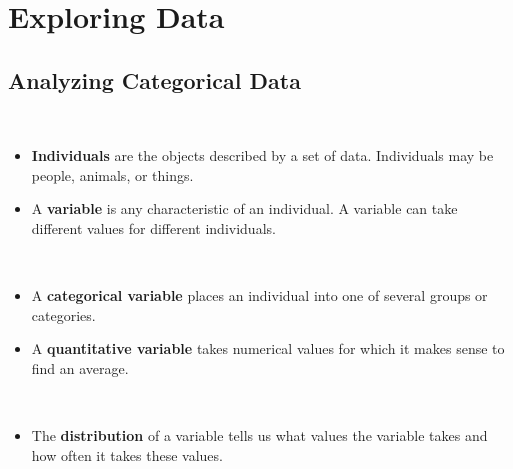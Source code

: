\documentclass[Main.tex]{subfiles}
\begin{document}
	
	\chapter{Exploring Data}
	
	
	\section{Analyzing Categorical Data}
	
	\begin{exercise} \hfill \\
		\begin{itemize}
			\item \textbf{Individuals} are the objects described by a set of data. Individuals may be people, animals, or things.\\
			\item A \textbf{variable} is any characteristic of an individual. A variable can take different values for different individuals.\\
		\end{itemize}
	\end{exercise}
			
	\begin{exercise} \hfill \\
		\begin{itemize}		
			\item A \textbf{categorical variable} places an individual into one of several groups or categories.\\
			\item A \textbf{quantitative variable} takes numerical values for which it makes sense to find an average.	
		\end{itemize}
	\end{exercise}
	
	\begin{exercise}[Distribution] \hfill \\
		\begin{itemize}	
			\item The \textbf{distribution} of a variable tells us what values the variable takes and how often it takes these values.
		\end{itemize}
	\end{exercise}
	
\end{document}
